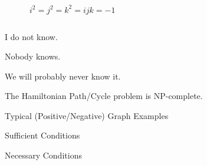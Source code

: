 \begin{frame}{}
  \begin{columns}
      \begin{center}
      \end{center}
      \begin{center}
      \end{center}
      \[
        i^2 = j^{2} = k^{2} = ijk = -1
      \]
  \end{columns}
\end{frame}

\begin{frame}{}
  \begin{columns}
      \pause
  \end{columns}
\end{frame}

\begin{frame}{}
  \begin{center}

    \pause
    \vspace{0.80cm}
    I do not know.

    \pause
    \vspace{0.80cm}
    Nobody knows.

    \pause
    \vspace{0.80cm}
    We will probably never know it.
  \end{center}
\end{frame}

\begin{frame}{}

  \begin{theorem}
    The Hamiltonian Path/Cycle problem is NP-complete.
  \end{theorem}
\end{frame}

\begin{frame}{}
  \begin{center}
    Typical (Positive/Negative) Graph Examples

    \vspace{1.00cm}
    Sufficient Conditions

    \vspace{1.00cm}
    Necessary Conditions
  \end{center}
\end{frame}



